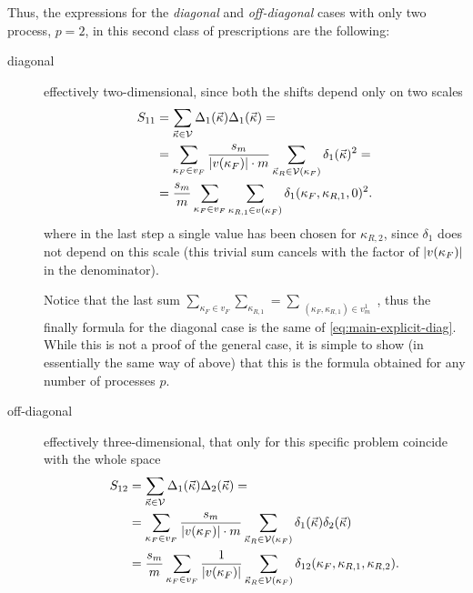 Thus, the expressions for the \textit{diagonal} and \textit{off-diagonal} cases
with only two process, $p = 2$, in this second class of prescriptions are the
following:
\begin{description}
    \item[diagonal] effectively two-dimensional, since both the shifts depend only on two scales
        \begin{align}
            S_{11} &= \sum_{\vec{\kappa} \in \mathcal{V}} \Delta_1(\vec{\kappa}) \Delta_1(\vec{\kappa}) =\\
                   &= \sum_{\kappa_F \in v_F} \frac{s_m}{\abs{v(\kappa_F)} \cdot m} \sum_{\vec{\kappa}_R \in \mathcal{V}(\kappa_F)}\delta_1(\vec{\kappa})^2 =\\
                   &= \frac{s_m}{m} \sum_{\kappa_F \in v_F} \sum_{\kappa_{R,1} \in v(\kappa_F) } \delta_1(\kappa_F, \kappa_{R, 1}, 0)^2
            \label{eq:slices-explicit-diag}.
        \end{align}
        where in the last step a single value has been chosen for $\kappa_{R,
        2}$, since $\delta_1$ does not depend on this scale (this trivial sum
        cancels with the factor of $\abs{v(\kappa_F)}$ in the denominator).

        Notice that the last sum $\sum_{\kappa_F \in v_F} \sum_{\kappa_{R,1}} =
        \sum_{\substack{(\kappa_F, \kappa_{R,1}) \in v_m^1 }}$, thus the
        finally formula for the diagonal case is the same of
        \cref{eq:main-explicit-diag}.
        While this is not a proof of the general case, it is simple to show (in
        essentially the same way of above) that this is the formula obtained for
        any number of processes $p$.
    \item[off-diagonal] effectively three-dimensional, that only for this
        specific problem coincide with the whole space
        \begin{align}
            S_{12} &= \sum_{\vec{\kappa} \in \mathcal{V}} \Delta_1(\vec{\kappa}) \Delta_2(\vec{\kappa}) =\\
                   &= \sum_{\kappa_F \in v_F} \frac{s_m}{\abs{v(\kappa_F)} \cdot m} \sum_{\vec{\kappa}_R \in \mathcal{V}(\kappa_F)}\delta_1(\vec{\kappa})\delta_2(\vec{\kappa})\\
                   &= \frac{s_m}{m} \sum_{\kappa_F \in v_F} \frac{1}{\abs{v(\kappa_F)}} \sum_{\vec{\kappa}_R \in \mathcal{V}(\kappa_F)}\delta_{12}(\kappa_F, \kappa_{R,1}, \kappa_{R,2})
            \label{eq:slices-explicit-off-diag}.
        \end{align}
\end{description}

